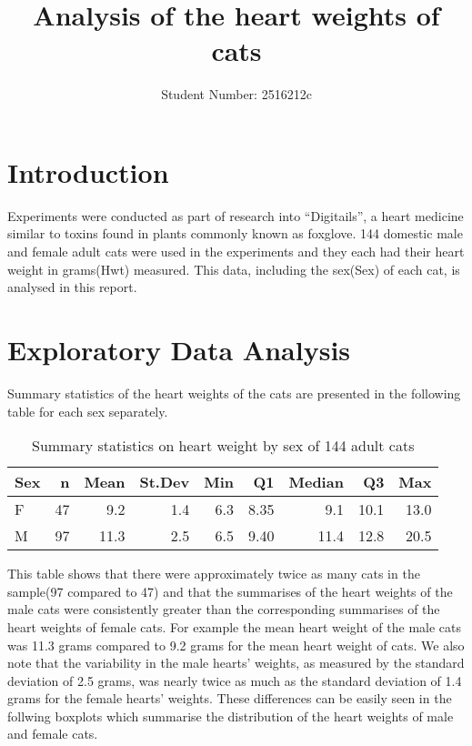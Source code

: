 \documentclass[
]{article}
\title{Analysis of the heart weights of cats}
\author{Student Number: 2516212c}
\date{}
\begin{document}
\maketitle

\hypertarget{sec:intro}{%
\section{Introduction}\label{sec:intro}}

Experiments were conducted as part of research into ``Digitails'', a
heart medicine similar to toxins found in plants commonly known as
foxglove. 144 domestic male and female adult cats were used in the
experiments and they each had their heart weight in grams(Hwt) measured.
This data, including the sex(Sex) of each cat, is analysed in this
report.

\hypertarget{sec:EDA}{%
\section{Exploratory Data Analysis}\label{sec:EDA}}

Summary statistics of the heart weights of the cats are presented in the
following table for each sex separately.

\begin{table}[!h]

\caption{\label{tab:summaries}\label{tab:summarises} Summary statistics on heart weight by sex of 144 adult cats}
\centering
\begin{tabular}[t]{l|r|r|r|r|r|r|r|r}
\hline
Sex & n & Mean & St.Dev & Min & Q1 & Median & Q3 & Max\\
\hline
F & 47 & 9.2 & 1.4 & 6.3 & 8.35 & 9.1 & 10.1 & 13.0\\
\hline
M & 97 & 11.3 & 2.5 & 6.5 & 9.40 & 11.4 & 12.8 & 20.5\\
\hline
\end{tabular}
\end{table}

This table shows that there were approximately twice as many cats in the
sample(97 compared to 47) and that the summarises of the heart weights
of the male cats were consistently greater than the corresponding
summarises of the heart weights of female cats. For example the mean
heart weight of the male cats was 11.3 grams compared to 9.2 grams for
the mean heart weight of cats. We also note that the variability in the
male hearts' weights, as measured by the standard deviation of 2.5
grams, was nearly twice as much as the standard deviation of 1.4 grams
for the female hearts' weights. These differences can be easily seen in
the follwing boxplots which summarise the distribution of the heart
weights of male and female cats.
\end{document}
